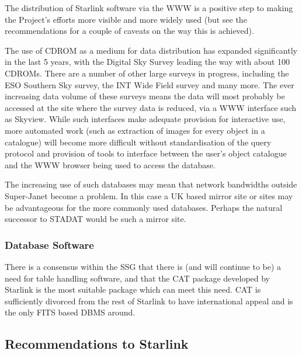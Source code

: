 The distribution of Starlink software via the WWW is a positive step
to making the Project's efforts more visible and more widely used (but
see the recommendations for a couple of caveats on the way this is
achieved).

The use of CDROM as a medium for data distribution has expanded
significantly in the last 5 years, with the Digital Sky Survey leading
the way with about 100 CDROMs. There are a number of other large surveys in
progress, including the ESO Southern Sky survey, the INT Wide Field
survey and many more. The ever increasing data volume of these surveys
means the data will most probably be accessed at the site where the
survey data is reduced, via a WWW interface such as Skyview. While
such interfaces make adequate provision for interactive use, more
automated work (such as extraction of images for every object in a
catalogue) will become more difficult without standardisation of the
query protocol and provision of tools to interface between the user's
object catalogue and the WWW browser being used to access the
database.

The increasing use of such databases may mean that network bandwidths
outside Super-Janet become a problem. In this case a UK based mirror
site or sites may be advantageous for the more commonly used
databases.  Perhaps the natural successor to STADAT would be such a
mirror site.

\subsubsection{Database Software}

There is a consensus within the SSG that there is (and will continue
to be) a need for table handling software, and that the CAT package
developed by Starlink is the most suitable package which can meet this
need. CAT is sufficiently divorced from the rest of Starlink to have
international appeal and is the only FITS based DBMS around.

\subsection{Recommendations to Starlink}

